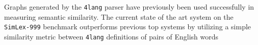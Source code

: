 Graphs generated by the \texttt{4lang} parser have previously been used
successfully in measuring semantic similarity. The current state of the
art system on the \texttt{SimLex-999} benchmark \cite{Hill:2014a}
outperforms previous top systems by utilizing a simple similarity metric
between \texttt{4lang} definitions of pairs of English words
\cite{Recski:2016c}
